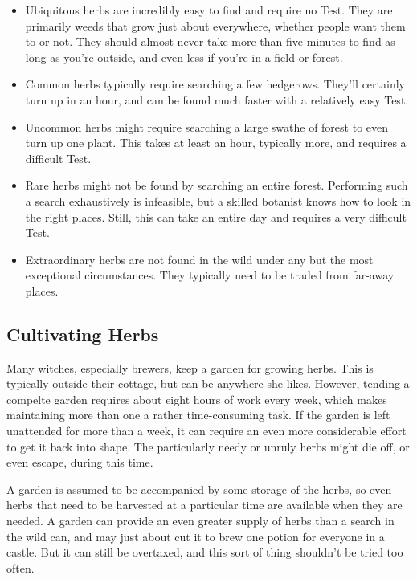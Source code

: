 \begin{itemize}
	\item Ubiquitous herbs are incredibly easy to find and require no Test.
		They are primarily weeds that grow just about everywhere, whether people want them to or not.
		They should almost never take more than five minutes to find as long as you're outside, and even less if you're in a field or forest.
	\item Common herbs typically require searching a few hedgerows.
		They'll certainly turn up in an hour, and can be found much faster with a relatively easy Test.
	\item Uncommon herbs might require searching a large swathe of forest to even turn up one plant.
		This takes at least an hour, typically more, and requires a difficult Test.
	\item Rare herbs might not be found by searching an entire forest.
		Performing such a search exhaustively is infeasible, but a skilled botanist knows how to look in the right places.
		Still, this can take an entire day and requires a very difficult Test.
	\item Extraordinary herbs are not found in the wild under any but the most exceptional circumstances.
		They typically need to be traded from far-away places.
\end{itemize}

\subsection{Cultivating Herbs}

Many witches, especially brewers, keep a garden for growing herbs.
This is typically outside their cottage, but can be anywhere she likes.
However, tending a compelte garden requires about eight hours of work every week, which makes maintaining more than one a rather time-consuming task.
If the garden is left unattended for more than a week, it can require an even more considerable effort to get it back into shape.
The particularly needy or unruly herbs might die off, or even escape, during this time.

A garden is assumed to be accompanied by some storage of the herbs, so even herbs that need to be harvested at a particular time are available when they are needed.
A garden can provide an even greater supply of herbs than a search in the wild can, and may just about cut it to brew one potion for everyone in a castle.
But it can still be overtaxed, and this sort of thing shouldn't be tried too often.

